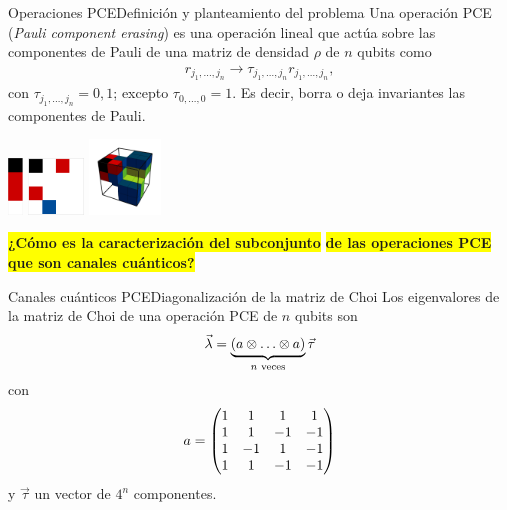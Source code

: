 \documentclass[xcolor=dvipsnames,presentation]{beamer}%
\begin{document}
\begin{frame}{Operaciones PCE}{Definición y planteamiento del problema}\pause
	Una operación PCE (\textit{Pauli component erasing}) 
	es una operación lineal que actúa sobre las
	componentes de Pauli de una matriz de densidad $\rho$ 
	de $n$ qubits como
	\begin{align*}
	r_{j_1,\ldots,j_n}\longrightarrow \tau_{j_1,\ldots,j_n}r_{j_1,\ldots,j_n},
	\end{align*}
	con $\tau_{j_1,\ldots,j_n}=0,1$; excepto $\tau_{0,\ldots,0}=1$.
	Es decir, borra o deja invariantes las componentes de Pauli. \pause
	
	\hfill
	\includegraphics[height=1.5cm]{images/1qubit-pce-example001}
	\hspace{1.8cm}
	\includegraphics[height=1.5cm]{images/2qubit-pce-example001}
	\hfill
	\includegraphics[height=2cm]{images/3qubit-pce-example001}
	\hspace{1cm} \pause

	\vfill	
	
	\colorbox{Yellow}{\textbf{¿Cómo es la caracterización del subconjunto}}
 	\colorbox{Yellow}{\textbf{de las operaciones PCE que son canales cuánticos?}}
\end{frame}


\begin{frame}{Canales cuánticos PCE}{Diagonalización de la matriz de Choi} \pause
Los eigenvalores de la matriz de Choi de una operación PCE 
de $n$ qubits son
\begin{align*}
\vec{\lambda} = 
\underbrace{\qty(a\otimes \ldots\otimes a)}_{n\text{ veces}} \vec{\tau}
\end{align*}
con
\begin{align*}
a=\mqty(1&1&1&1\\1&1&-1&-1\\1&-1&1&-1\\1&1&-1&-1)
\end{align*}
y $\vec{\tau}$ un vector de $4^n$ componentes.
\end{frame}
\end{document}
